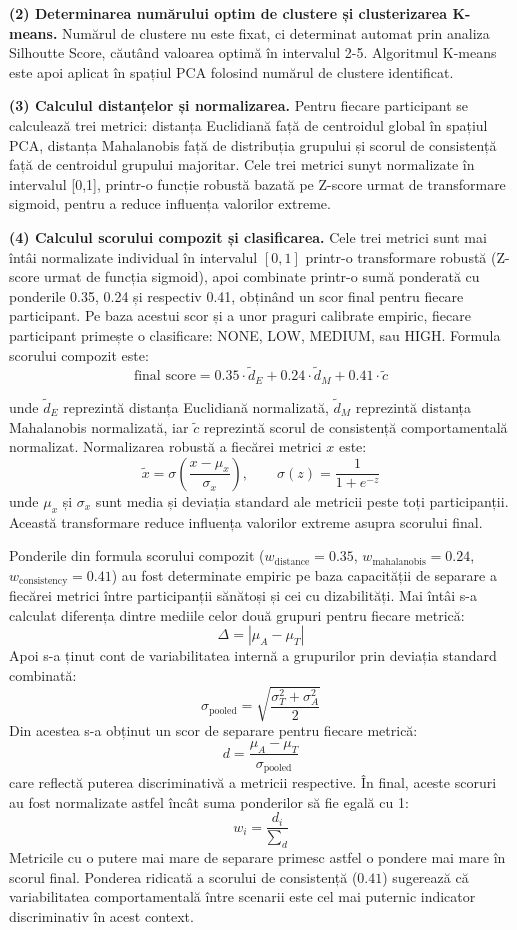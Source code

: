 \documentclass[12pt,a4paper]{report}
\theoremstyle{definition}
\theoremstyle{remark}
\begin{document}
\textbf{(2) Determinarea numărului optim de clustere și clusterizarea K-means.} Numărul de clustere nu este fixat, ci determinat automat prin analiza Silhoutte Score, căutând valoarea optimă în intervalul 2-5. Algoritmul K-means este apoi aplicat în spațiul PCA folosind numărul de clustere identificat.

\textbf{(3) Calculul distanțelor și normalizarea.} Pentru fiecare participant se calculează trei metrici: distanța Euclidiană față de centroidul global în spațiul PCA, distanța Mahalanobis față de distribuția grupului și scorul de consistență față de centroidul grupului majoritar. Cele trei metrici sunyt normalizate în intervalul [0,1], printr-o funcție robustă bazată pe Z-score urmat de transformare sigmoid, pentru a reduce influența valorilor extreme. 

\textbf{(4) Calculul scorului compozit și clasificarea.} Cele trei metrici sunt mai întâi normalizate individual în intervalul $[0,1]$ printr-o transformare robustă (Z-score urmat de funcția sigmoid), apoi combinate printr-o sumă ponderată cu ponderile 0.35, 0.24 și respectiv 0.41, obținând un scor final pentru fiecare participant. Pe baza acestui scor și a unor praguri calibrate empiric, fiecare participant primește o clasificare: NONE, LOW, MEDIUM, sau HIGH. Formula scorului compozit este:
\[
\text{final score} = 0.35 \cdot \tilde{d}_E + 0.24 \cdot \tilde{d}_M + 0.41 \cdot \tilde{c}
\]

unde $\tilde{d}_E$ reprezintă distanța Euclidiană normalizată, $\tilde{d}_M$ reprezintă distanța Mahalanobis normalizată, iar $\tilde{c}$ reprezintă scorul de consistență comportamentală normalizat. Normalizarea robustă a fiecărei metrici $x$ este:
\[
\tilde{x} = \sigma\!\left(\frac{x - \mu_x}{\sigma_x}\right), \qquad \sigma(z) = \frac{1}{1 + e^{-z}}
\]
unde $\mu_x$ și $\sigma_x$ sunt media și deviația standard ale metricii peste toți participanții. Această transformare reduce influența valorilor extreme asupra scorului final.

Ponderile din formula scorului compozit ($w_{\text{distance}} = 0.35$, $w_{\text{mahalanobis}} = 0.24$, $w_{\text{consistency}} = 0.41$) au fost determinate empiric pe baza capacității de separare a fiecărei metrici între participanții sănătoși și cei cu dizabilități. Mai întâi s-a calculat diferența dintre mediile celor două grupuri pentru fiecare metrică:
\[
\Delta = |\mu_A - \mu_T|
\]
Apoi s-a ținut cont de variabilitatea internă a grupurilor prin deviația standard combinată:
\[
\sigma_{\text{pooled}} = \sqrt{\frac{\sigma_T^2 + \sigma_A^2}{2}}
\]
Din acestea s-a obținut un scor de separare pentru fiecare metrică:
\[
d = \frac{\mu_A - \mu_T}{\sigma_{\text{pooled}}}
\]
care reflectă puterea discriminativă a metricii respective. În final, aceste scoruri au fost normalizate astfel încât suma ponderilor să fie egală cu 1:
\[
w_i = \frac{d_i}{\sum_d}
\]
Metricile cu o putere mai mare de separare primesc astfel o pondere mai mare în scorul final. Ponderea ridicată a scorului de consistență ($0.41$) sugerează că variabilitatea comportamentală între scenarii este cel mai puternic indicator discriminativ în acest context.
\end{document}

